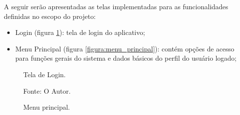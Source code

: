 A seguir serão apresentadas as telas implementadas para as funcionalidades definidas no escopo do projeto:

\begin{itemize}
	\item Login (figura \ref{figura:login}): tela de login do aplicativo;
	\item Menu Principal (figura \ref{figura:menu_principal}): contém opções de acesso para funções gerais do sistema e dados básicos do perfil do usuário logado;
\end{itemize}

\begin{figure}[H]
    \begin{minipage}[b]{0.45\linewidth}
        \caption{Tela de Login.}
    	\centering %
    	\label{figura:login}
    	\captionsetup{singlelinecheck = false, format= hang, justification=raggedright, labelsep=space, width=6.5cm}
    	\caption*{\footnotesize Fonte: O Autor.}
    \end{minipage}
    \hspace{0.5cm}
    \begin{minipage}[b]{0.45\linewidth}
        \caption{Menu principal.}
    	\centering %

\end{minipage}
\end{figure}
